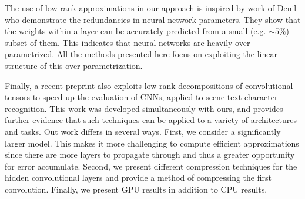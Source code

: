 The use of low-rank approximations in our approach is inspired by work
of Denil \etal \cite{denil2013predicting} who demonstrate the redundancies in neural
network parameters. They show that the weights within a layer can be
accurately predicted from a small (e.g. $\sim 5\%$) subset of them. This
indicates that neural networks are heavily over-parametrized.  All the
methods presented here focus on exploiting the linear structure of this
over-parametrization.

Finally, a recent preprint \cite{zisserman14} also exploits low-rank decompositions
of convolutional tensors to speed up the evaluation of CNNs, applied to scene text character
recognition. This work was developed simultaneously with ours, and provides 
further evidence that such techniques can be applied to a variety of architectures 
and tasks. 
Out work differs in several ways. 
First, we consider a significantly larger model. 
This makes it more challenging to compute efficient approximations since there are more layers to propagate through and thus a greater opportunity for error accumulate. 
Second, we present different compression techniques for the hidden convolutional layers and provide a method of compressing the first convolution. Finally, we present GPU results in addition to CPU results. 

